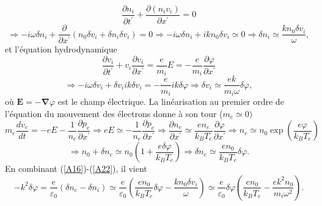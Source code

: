 \documentclass[10pt,thmsa]{article}
\begin{document}
\begin{equation}
\frac{\partial n_{i}}{\partial t^{\prime}}+\frac{\partial(n_{i}v_{i}%
)}{\partial x^{\prime}}=0\label{A17}%
\end{equation}%
\begin{equation}
\Rightarrow-i\omega\delta n_{i}+\frac{\partial}{\partial x^{\prime}}%
(n_{0}\delta v_{i}+\delta n_{i}\delta v_{i})=0\Rightarrow-i\omega\delta
n_{i}+ikn_{0}\delta v_{i}\simeq0\Rightarrow\delta n_{i}\simeq\frac
{kn_{0}\delta v_{i}}{\omega},\label{A18}%
\end{equation}
et l'\'{e}quation hydrodynamique
\begin{equation}
\frac{\partial v_{i}}{\partial t^{\prime}}+v_{i}\frac{\partial v_{i}}{\partial
x^{\prime}}=\frac{e}{m_{i}}E=-\frac{e}{m_{i}}\frac{\partial\varphi}{\partial
x^{\prime}}\label{A19}%
\end{equation}%
\begin{equation}
\Rightarrow-i\omega\delta v_{i}+\delta v_{i}ik\delta v_{i}=-\frac{e}{m_{i}%
}ik\delta\varphi\Rightarrow\delta v_{i}\simeq\frac{ek}{m_{i}\omega}%
\delta\varphi,\label{A20}%
\end{equation}
o\`{u} $\mathbf{E}=-\mathbf{\nabla}\varphi$ est le champ \'{e}lectrique. La
lin\'{e}arisation au premier ordre de l'\'{e}quation du mouvement des
\'{e}lectrons donne \`{a} son tour ($m_{e}\simeq0)$%
\begin{equation}
m_{e}\frac{dv_{e}}{dt}=-eE-\frac{1}{n_{e}}\frac{\partial p_{e}}{\partial
x^{\prime}}\Rightarrow eE\simeq-\frac{1}{n_{e}}\frac{\partial p_{e}}{\partial
x^{\prime}}\Rightarrow\frac{\partial n_{e}}{\partial x^{\prime}}\simeq
\frac{en_{e}}{k_{B}T_{e}}\frac{\partial\varphi}{\partial x^{\prime}%
}\Rightarrow n_{e}\simeq n_{0}\exp(\frac{e\varphi}{k_{B}T_{e}})\label{A21}%
\end{equation}%
\begin{equation}
\Rightarrow n_{0}+\delta n_{e}\simeq n_{0}(1+\frac{e\delta\varphi}{k_{B}T_{e}%
})\Rightarrow\delta n_{e}\simeq\frac{en_{0}}{k_{B}T_{e}}\delta\varphi
.\label{A22}%
\end{equation}
En combinant (\ref{A16})-(\ref{A22}), il vient
\begin{equation}
-k^{2}\delta\varphi=\frac{e}{\varepsilon_{0}}(\delta n_{e}-\delta n_{i}%
)\simeq\frac{e}{\varepsilon_{0}}(\frac{en_{0}}{k_{B}T_{e}}\delta\varphi
-\frac{kn_{0}\delta v_{i}}{\omega})\simeq\frac{e}{\varepsilon_{0}}%
\delta\varphi(\frac{en_{0}}{k_{B}T_{e}}-\frac{ek^{2}n_{0}}{m_{i}\omega^{2}%
}).\label{A23}%
\end{equation}
\end{document}

